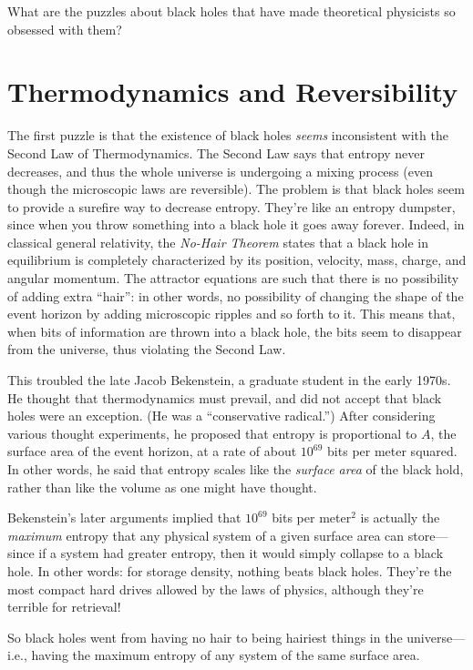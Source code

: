 \documentclass[12pt]{report}
\theoremstyle{plain}
\theoremstyle{definition}
\begin{document}
What are the puzzles about black holes that have made theoretical physicists so obsessed with them?

\section{Thermodynamics and Reversibility}

The first puzzle is that the existence of black holes {\em seems} inconsistent with
the Second Law of Thermodynamics.
The Second Law says that entropy never decreases,
and thus the whole universe is undergoing a mixing process
(even though the microscopic laws are reversible).
The problem is that black holes seem to provide a surefire way to decrease entropy. They're like
an entropy dumpster, since when you throw something into a black
hole it goes away forever.
Indeed, in classical general relativity, the {\it No-Hair Theorem}
states that a black hole in equilibrium is completely characterized by its
position, velocity,
mass, charge, and angular momentum.
The attractor equations are such that there
is no possibility of adding extra ``hair'': in other words, no possibility of changing
the shape of the event horizon by adding microscopic ripples and so forth to it.
This means that, when bits of information are
thrown into a black hole, the bits seem to disappear from the universe,
thus violating the Second Law.

This troubled the late Jacob Bekenstein, a graduate student in the early 1970s.
He thought that thermodynamics must prevail, and did not accept
that black holes were an exception.
(He was a ``conservative radical.'')
After considering various thought experiments, he proposed
that entropy is proportional to $A$, the surface area of
the event horizon, at a rate of about $10^{69}$ bits per meter squared.
In other words, he said that entropy scales like the {\em surface area} of the black
hold, rather than like the volume as one might have thought.

Bekenstein's later arguments implied that $10^{69}$ bits per meter$^2$ is actually the {\em maximum}
entropy that any physical system of a given surface area can store---since if a system had greater entropy,
then it would simply collapse to a black hole.  In other words: for storage density, nothing beats black holes.
They're the most compact hard drives allowed by the laws of physics, although they're terrible for retrieval!

So black holes went from having no hair to being hairiest things in the universe---i.e.,
having the maximum entropy of any system of the same surface area.
\end{document}
